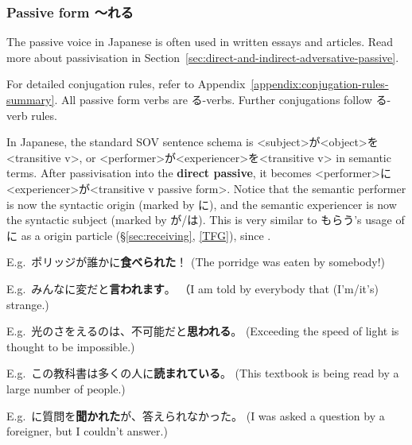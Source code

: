\documentclass[../nihongo-gakushuu-kyouzai.tex]{subfiles}
\begin{document}
\subsubsection{Passive form  〜れる} \label{sec:causative-form}

The passive voice in Japanese is often used in written essays and articles. Read more about passivisation in Section~\ref{sec:direct-and-indirect-adversative-passive}.

For detailed conjugation rules, refer to Appendix~\ref{appendix:conjugation-rules-summary}. All passive form verbs are る-verbs. Further conjugations follow る-verb rules. 


In Japanese, the standard SOV sentence schema is <subject>が<object>を<transitive v>, or <performer>が<experiencer>を<transitive v> in semantic terms. After passivisation into the \textbf{direct passive}, it becomes <performer>に<experiencer>が<transitive v passive form>. Notice that the semantic performer is now the syntactic origin (marked by に), and the semantic experiencer is now the syntactic subject (marked by が/は). This is very similar to もらう's usage of に as a origin particle (\S\ref{sec:receiving}, \href{https://www.tofugu.com/japanese-grammar/particle-ni/\#in-social-interactions-and-transactions}{[TFG]}), since .

E.g.\ ポリッジが誰かに\textbf{食べられた}！ (The porridge was eaten by somebody!)

E.g.\ みんなに変だと\textbf{言われます}。 （I am told by everybody that (I'm/it's) strange.)

E.g.\ 光のさをえるのは、不可能だと\textbf{思われる}。 (Exceeding the speed of light is thought to be impossible.)

E.g.\ この教科書は多くの人に\textbf{読まれている}。 (This textbook is being read by a large number of people.)

E.g.\ に質問を\textbf{聞かれた}が、答えられなかった。 (I was asked a question by a foreigner, but I couldn't answer.)
\end{document}
